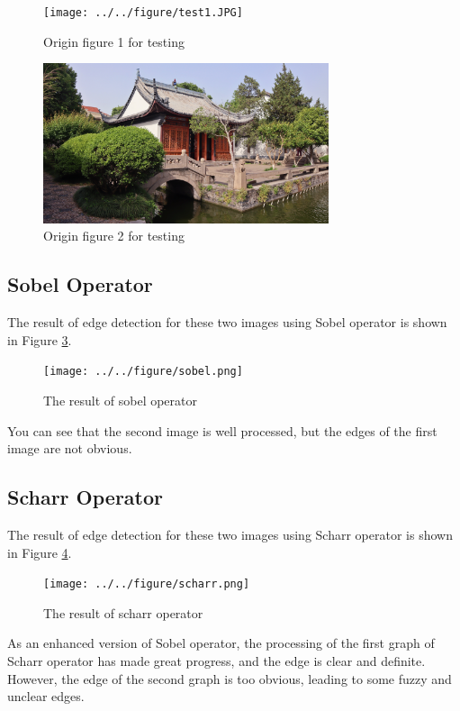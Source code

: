 \documentclass[review]{cvpr}
\begin{document}
\begin{figure}[htbp]
\centering
  \texttt{[image: ../../figure/test1.JPG]}
  \caption{Origin figure 1 for testing}
  \label{og1}
\end{figure}

\begin{figure}[htbp]
\centering
  \includegraphics[width=3.3in]{../../figure/test2.JPG}
  \caption{Origin figure 2 for testing}
  \label{og2}
\end{figure}

\subsection{Sobel Operator}

The result of edge detection for these two images using Sobel operator is shown in Figure \ref{sobel}.


\begin{figure}[htbp]
\centering
  \texttt{[image: ../../figure/sobel.png]}
  \caption{The result of sobel operator}
  \label{sobel}
\end{figure}

You can see that the second image is well processed, but the edges of the first image are not obvious.

\subsection{Scharr Operator}

The result of edge detection for these two images using Scharr operator is shown in Figure \ref{scharr}.

\begin{figure}[htbp]
\centering
  \texttt{[image: ../../figure/scharr.png]}
  \caption{The result of scharr operator}
  \label{scharr}
\end{figure}

As an enhanced version of Sobel operator, the processing of the first graph of Scharr operator has made great progress, and the edge is clear and definite. However, the edge of the second graph is too obvious, leading to some fuzzy and unclear edges.
\end{document}
